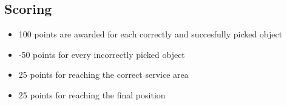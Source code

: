 \subsection{Scoring}
\begin{itemize}
\item 100 points are awarded for each correctly and succesfully picked object
\item -50 points for every incorrectly picked object
\item 25 points for reaching the correct service area
\item 25 points for reaching the final position
\end{itemize}
